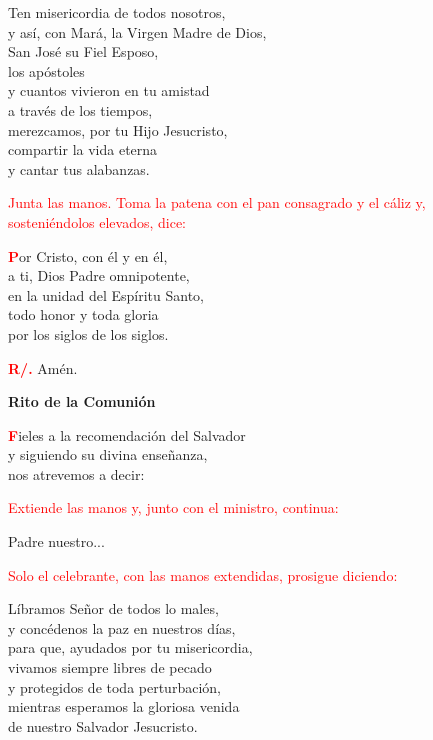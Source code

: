\documentclass[12pt, letterpaper]{report}
\begin{document}
	\noindent
	Ten misericordia de todos nosotros,\\
	y as\'i, con Mar\'a, la Virgen Madre de Dios,\\
	San Jos\'e su Fiel Esposo, \\
	los ap\'ostoles\\
	y cuantos vivieron en tu amistad\\
	a trav\'es de los tiempos,\\
	merezcamos, por tu Hijo Jesucristo,\\
	compartir la vida eterna\\
	y cantar tus alabanzas.

	\large{\textcolor{red}{Junta las manos. Toma la patena con el pan consagrado y el c\'aliz y, sosteni\'endolos elevados, dice:}}

	\lettrine[lines=2]{\bfseries \textcolor{red}{P}}{}\Large or Cristo, con \'el y en \'el,\\
	a ti, Dios Padre omnipotente,\\
	en la unidad del Esp\'iritu Santo,\\
	todo honor y toda gloria\\
	por los siglos de los siglos.

	\Large \hspace{-0.9cm} {\bfseries \textcolor{red}{R/.}} \hspace{0.5cm} Am\'en.

	\begin{center}
		\Huge {\bfseries Rito de la Comuni\'on}
	\end{center}

	\lettrine[lines=2]{\bfseries \textcolor{red}{F}}{}\Large ieles a la recomendaci\'on del Salvador\\
	y siguiendo su divina ense\~nanza,\\
	nos atrevemos a decir:

	\large{\textcolor{red}{Extiende las manos y, junto con el ministro, continua:}}

	\noindent
	\Large Padre nuestro...

	\large{\textcolor{red}{Solo el celebrante, con las manos extendidas, prosigue diciendo:}}

	\noindent
	\Large L\'ibramos Se\~nor de todos lo males,\\
	y conc\'edenos la paz en nuestros d\'ias,\\
	para que, ayudados por tu misericordia,\\
	vivamos siempre libres de pecado\\
	y protegidos de toda perturbaci\'on,\\
	mientras esperamos la gloriosa venida\\
	de nuestro Salvador Jesucristo.
\end{document}
